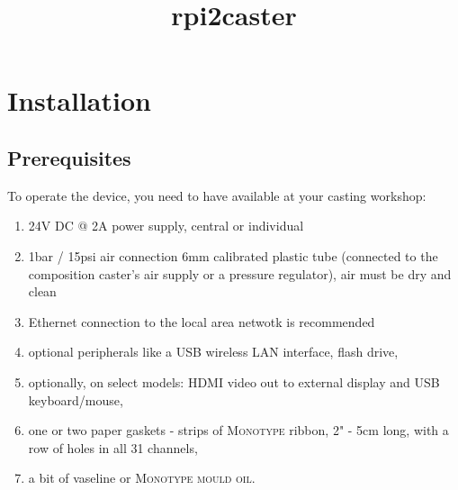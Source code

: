 \documentclass[draft, 12pt, a4paper]{book}
\title{rpi2caster}
\begin{document}
\chapter{Installation}
\section{Prerequisites}
To operate the device, you need to have available at your casting workshop:
\begin{enumerate}
\item 24V DC @ 2A power supply, central or individual
\item 1bar / 15psi air connection 6mm calibrated plastic tube (connected to the composition caster's air supply or a pressure regulator), air must be dry and clean 
\item Ethernet connection to the local area netwotk is recommended
\item optional peripherals like a USB wireless LAN interface, flash drive, 
\item optionally, on select models: HDMI video out to external display and USB keyboard/mouse,
\item one or two paper gaskets - strips of \textsc{Monotype} ribbon, 2" - 5cm long, with a row of holes in all 31 channels,
\item a bit of vaseline or \textsc{Monotype mould oil}.
\end{enumerate}
\end{document}
